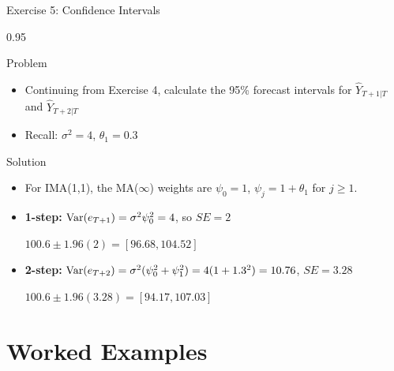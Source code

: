 \documentclass[9pt, aspectratio=169, t]{beamer}
\begin{document}
\begin{frame}{Exercise 5: Confidence Intervals}
    \begin{cminipage}{0.95\textwidth}
    \begin{alertblock}{Problem}
        \begin{itemize}\setlength{\itemsep}{0pt}
            \item Continuing from Exercise 4, calculate the 95\% forecast intervals for $\hat{Y}_{T+1|T}$ and $\hat{Y}_{T+2|T}$
            \item Recall: $\sigma^2 = 4$, $\theta_1 = 0.3$
        \end{itemize}
    \end{alertblock}

    \vspace{0.2cm}
    \begin{exampleblock}{Solution}
        \begin{itemize}\setlength{\itemsep}{0pt}
            \item For IMA(1,1), the MA($\infty$) weights are $\psi_0 = 1$, $\psi_j = 1 + \theta_1$ for $j \geq 1$.
            \item \textbf{1-step:} $\text{Var}(e_{T+1}) = \sigma^2 \psi_0^2 = 4$, so $SE = 2$

            $100.6 \pm 1.96(2) = \mathbf{[96.68, 104.52]}$
            \item \textbf{2-step:} $\text{Var}(e_{T+2}) = \sigma^2(\psi_0^2 + \psi_1^2) = 4(1 + 1.3^2) = 10.76$, $SE = 3.28$

            $100.6 \pm 1.96(3.28) = \mathbf{[94.17, 107.03]}$
        \end{itemize}
    \end{exampleblock}
    \end{cminipage}
\end{frame}

\section{Worked Examples}
\end{document}
